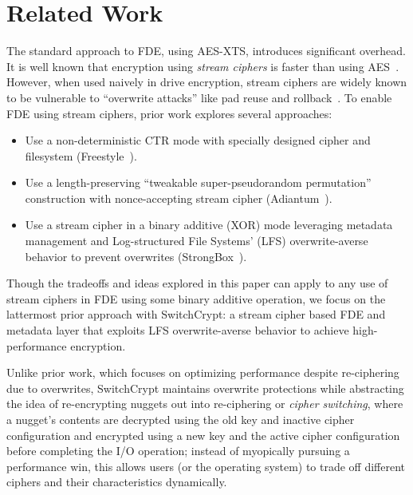 \section{Related Work}\label{sec:related}

The standard approach to FDE, using AES-XTS, introduces significant overhead. It
is well known that encryption using \emph{stream ciphers} is faster than using
AES~\cite{StrongBox, AnotherPaper1, AnotherPaper2}. However, when used naively
in drive encryption, stream ciphers are widely known to be vulnerable to
``overwrite attacks'' like pad reuse and rollback~\cite{KatzLindell, StrongBox}.
To enable FDE using stream ciphers, prior work explores several approaches:

\begin{itemize}
   \item Use a non-deterministic CTR mode with specially designed cipher and
   filesystem (Freestyle~\cite{Freestyle}).
   \item Use a length-preserving ``tweakable super-pseudorandom permutation''
   construction with nonce-accepting stream cipher (Adiantum~\cite{Adiantum}).
   \item Use a stream cipher in a binary additive (XOR) mode leveraging metadata
   management and Log-structured File Systems' (LFS) overwrite-averse behavior
   to prevent overwrites (StrongBox~\cite{StrongBox}).
\end{itemize}

Though the tradeoffs and ideas explored in this paper can apply to any use of
stream ciphers in FDE using some binary additive operation, we focus on the
lattermost prior approach with SwitchCrypt: a stream cipher based FDE and
metadata layer that exploits LFS overwrite-averse behavior to achieve
high-performance encryption.

Unlike prior work, which focuses on optimizing performance despite re-ciphering
due to overwrites, SwitchCrypt maintains overwrite protections while abstracting
the idea of re-encrypting nuggets out into re-ciphering or \emph{cipher
switching}, where a nugget's contents are decrypted using the old key and
inactive cipher configuration and encrypted using a new key and the active
cipher configuration before completing the I/O operation; instead of myopically
pursuing a performance win, this allows users (or the operating system) to trade
off different ciphers and their characteristics dynamically.


